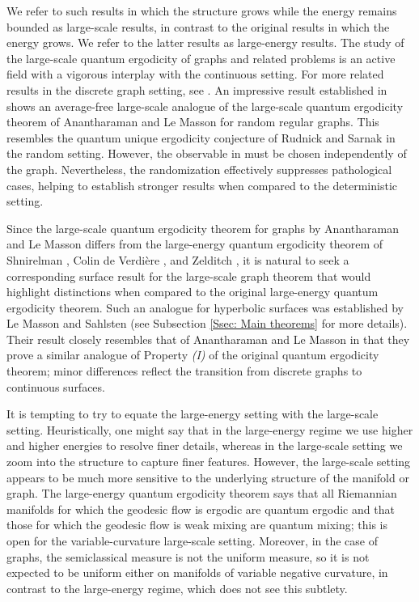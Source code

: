 \documentclass[11pt,twoside,reqno]{amsart} \usepackage{a4wide} \usepackage[T1]{fontenc} \usepackage[utf8]{inputenc} \usepackage{soul}  \usepackage{amsmath} \usepackage{amsfonts} \usepackage{amssymb} \usepackage{mathtools} \usepackage{amsthm} \usepackage{xcolor} \usepackage{graphicx} \usepackage{hyperref} \usepackage{standalone} \usepackage{esint} \usepackage{comment} \usepackage[left=2.3cm,top=3cm,right=2.3cm]{geometry} \usepackage{bm} \usepackage{svg} \usepackage{float} \numberwithin{equation}{section} \theoremstyle{plain} \newtheorem{thm}{Theorem}[section] \newtheorem{theorem}[thm]{Theorem} \newtheorem*{theorem*}{Theorem}\newtheorem{conj}[thm]{Conjecture} \newtheorem{lemma}[thm]{Lemma} \newtheorem{prop}[thm]{Proposition} \newtheorem{proposition}[thm]{Proposition} \newtheorem{cor}[thm]{Corollary} \newtheorem{question}[thm]{Question} \newtheorem{corollary}[thm]{Corollary} \newtheorem{assumption}[thm]{Assumption} \theoremstyle{definition} \newtheorem{defn}[thm]{Definition} \newtheorem{choice}[thm]{Choice} \newtheorem{definition}[thm]{Definition} \newtheorem{ex}[thm]{Example} \newtheorem{notation}[thm]{Notation} \newtheorem*{ack}{Acknowledgements} \theoremstyle{remark} \newtheorem{remark}[thm]{Remark} \newtheorem{bigremark}[thm]{Remark} \usepackage{xcolor} \newcommand{\red}[1]{ {\color{Red}#1} } \newcommand{\blue}[1]{ {\color{Blue}#1} } \author{Kai Hippi} \address{Aalto University, Espoo, Finland} \email{kai.hippi@aalto.fi}
\begin{document}
We refer to such results in which the structure grows while the energy remains bounded as large-scale results, in contrast to the original results in which the energy grows. We refer to the latter results as large-energy results. The study of the large-scale quantum ergodicity of graphs and related problems is an active field with a vigorous interplay with the continuous setting. For more related results in the discrete graph setting, see \cite{DP12, BL13, EKYY13, TVW13, AL15, Gei15, BLL16, Ana17, AS17, BHKY17, BKY17, AS19, BS19, BHY19, McK22, MS23}. An impressive result established in \cite{BHKY17, BKY17, BHY19} shows an average-free large-scale analogue of the large-scale quantum ergodicity theorem of Anantharaman and Le Masson \cite{AL15} for random regular graphs. This resembles the quantum unique ergodicity conjecture of Rudnick and Sarnak \cite{RS94} in the random setting. However, the observable in \cite{BHKY17, BKY17, BHY19} must be chosen independently of the graph. Nevertheless, the randomization effectively suppresses pathological cases, helping to establish stronger results when compared to the deterministic setting.

Since the large-scale quantum ergodicity theorem for graphs by Anantharaman and Le Masson \cite{AL15} differs from the large-energy quantum ergodicity theorem of Shnirelman \cite{Shn74}, Colin de Verdi\`{e}re \cite{CdV85}, and Zelditch \cite{Zel87}, it is natural to seek a corresponding surface result for the large-scale graph theorem that would highlight distinctions when compared to the original large-energy quantum ergodicity theorem. Such an analogue for hyperbolic surfaces was established by Le Masson and Sahlsten \cite{LS17} (see Subsection \ref{Ssec: Main theorems} for more details). Their result closely resembles that of Anantharaman and Le Masson in that they prove a similar analogue of Property \emph{(I)} of the original quantum ergodicity theorem; minor differences reflect the transition from discrete graphs to continuous surfaces.

It is tempting to try to equate the large-energy setting with the large-scale setting. Heuristically, one might say that in the large-energy regime we use higher and higher energies to resolve finer details, whereas in the large-scale setting we zoom into the structure to capture finer features. However, the large-scale setting appears to be much more sensitive to the underlying structure of the manifold or graph. The large-energy quantum ergodicity theorem says that all Riemannian manifolds for which the geodesic flow is ergodic are quantum ergodic and that those for which the geodesic flow is weak mixing are quantum mixing; this is open for the variable-curvature large-scale setting. Moreover, in the case of graphs, the semiclassical measure is not the uniform measure, so it is not expected to be uniform either on manifolds of variable negative curvature, in contrast to the large-energy regime, which does not see this subtlety. 
\end{document}
